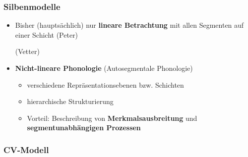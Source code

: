 \begin{frame}
\frametitle{Silbenmodelle}

\begin{itemize}
	\item Bisher (hauptsächlich) nur \textbf{lineare Betrachtung} mit allen Segmenten auf einer Schicht
	  \ea
           (Peter)
          \z
	
	  \ea
           (Vetter)
          \z

	\item \textbf{Nicht-lineare Phonologie} (Autosegmentale Phonologie)
	
	\begin{itemize}
		\item verschiedene Repräsentationsebenen bzw. Schichten
		
		\item hierarchische Strukturierung
		
		\item Vorteil: Beschreibung von \textbf{Merkmalsausbreitung} und \textbf{segmentunabhängigen Prozessen}
		
	\end{itemize}
\end{itemize}

\end{frame}



\subsubsection{CV-Modell}



